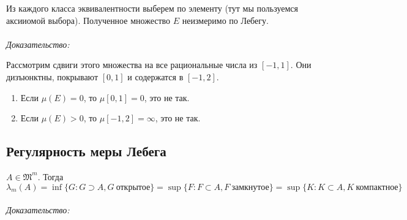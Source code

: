 \documentclass[paper=a4, fontsize=11pt]{article}
\begin{document}
Из каждого класса эквивалентности выберем по элементу (тут мы пользуемся аксииомой выбора).
Полученное множество $E$ неизмеримо по Лебегу.
\\\\
\emph{Доказательство:}

Рассмотрим сдвиги этого множества на все рациональные числа из $[-1,1]$. Они дизъюнктны, покрывают $[0,1]$ и содержатся в $[-1,2]$.
\begin{enumerate}
    \item Если $\mu(E)=0$, то $\mu[0,1]=0$, это не так.
    \item Если $\mu(E)>0$, то $\mu[-1,2]=\infty$, это не так.
\end{enumerate}

\subsection{Регулярность меры Лебега}
$A \in \mathfrak{M}^m$. Тогда
$$\lambda_m(A) = \inf \{G: G \supset A, G\ \text{открытое}\} = \sup \{F: F \subset A, F\ \text{замкнутое}\} =
\sup \{K: K \subset A, K\ \text{компактное}\}$$
\\
\emph{Доказательство:}
\end{document}
